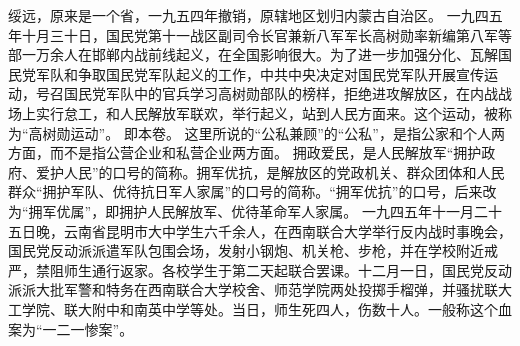 \begin{maonote}
绥远，原来是一个省，一九五四年撤销，原辖地区划归内蒙古自治区。
一九四五年十月三十日，国民党第十一战区副司令长官兼新八军军长高树勋率新编第八军等部一万余人在邯郸内战前线起义，在全国影响很大。为了进一步加强分化、瓦解国民党军队和争取国民党军队起义的工作，中共中央决定对国民党军队开展宣传运动，号召国民党军队中的官兵学习高树勋部队的榜样，拒绝进攻解放区，在内战战场上实行怠工，和人民解放军联欢，举行起义，站到人民方面来。这个运动，被称为“高树勋运动”。
即本卷。
这里所说的“公私兼顾”的“公私”，是指公家和个人两方面，而不是指公营企业和私营企业两方面。
拥政爱民，是人民解放军“拥护政府、爱护人民”的口号的简称。拥军优抗，是解放区的党政机关、群众团体和人民群众“拥护军队、优待抗日军人家属”的口号的简称。“拥军优抗”的口号，后来改为“拥军优属”，即拥护人民解放军、优待革命军人家属。
一九四五年十一月二十五日晚，云南省昆明市大中学生六千余人，在西南联合大学举行反内战时事晚会，国民党反动派派遣军队包围会场，发射小钢炮、机关枪、步枪，并在学校附近戒严，禁阻师生通行返家。各校学生于第二天起联合罢课。十二月一日，国民党反动派派大批军警和特务在西南联合大学校舍、师范学院两处投掷手榴弹，并骚扰联大工学院、联大附中和南英中学等处。当日，师生死四人，伤数十人。一般称这个血案为“一二一惨案”。
\end{maonote}
